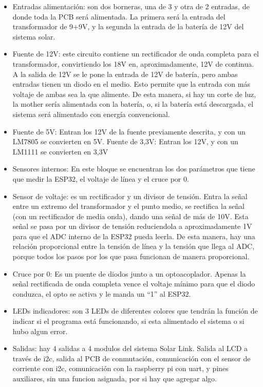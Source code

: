 \begin{itemize}
\item Entradas alimentación: son dos borneras, una de 3 y otra de 2 entradas, de donde toda la PCB será alimentada. La primera será la entrada del transformador de 9+9V, y la segunda la entrada de la batería de 12V del sistema solar.
\item Fuente de 12V: este circuito contiene un rectificador de onda completa para el transformador, convirtiendo los 18V en, aproximadamente, 12V de continua. A la salida de 12V se le pone la entrada de 12V de batería, pero ambas entradas tienen un diodo en el medio. Esto permite que la entrada con más voltaje de ambas sea la que alimente. De esta manera, si hay un corte de luz, la mother sería alimentada con la batería, o, si la batería está descargada, el sistema será alimentado con energía convencional.
\item Fuente de 5V: Entran los 12V de la fuente previamente descrita, y con un LM7805 se convierten en 5V.
Fuente de 3,3V: Entran los 12V, y con un LM1111 se convierten en 3,3V
\item Sensores internos: En este bloque se encuentran los dos parámetros que tiene que medir la ESP32, el voltaje de línea y el cruce por 0.
\item Sensor de voltaje: es un rectificador y un divisor de tensión. Entra la señal entre un extremo del transformador y el punto medio, se rectifica la señal (con un rectificador de media onda), dando una señal de más de 10V. Esta señal se pasa por un divisor de tensión reduciendola a aproximadamente 1V para que el ADC interno de la ESP32 pueda leerla. De esta manera, hay una relación proporcional entre la tensión de línea y la tensión que llega al ADC, porque todos los pasos por los que pasa funcionan de manera proporcional.
\item Cruce por 0: Es un puente de diodos junto a un optoacoplador. Apenas la señal rectificada de onda completa vence el voltaje mínimo para que el diodo conduzca, el opto se activa y le manda un “1” al ESP32.
\item LEDs indicadores: son 3 LEDs de diferentes colores que tendrán la función de indicar si el programa está funcionando, si esta alimentado el sistema o si hubo algun error.
\item Salidas: hay 4 salidas a 4 modulos del sistema Solar Link. Salida al LCD a través de i2c, salida al PCB de conmutación, comunicación con el sensor de corriente con i2c, comunicación con la raspberry pi con uart, y pines auxiliares, sin una funcion asignada, por si hay que agregar algo.
\end{itemize}

